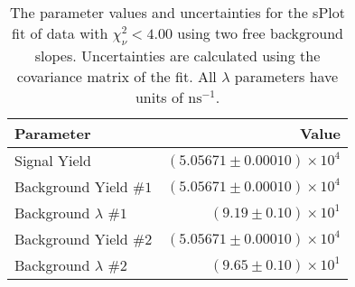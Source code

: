 
\begin{table}[ht]
    \begin{center}
        \begin{tabular}{lr}\toprule
            Parameter & Value \\\midrule
            Signal Yield & $(5.05671 \pm 0.00010) \times 10^{4}$ \\
            Background Yield $\#1$ & $(5.05671 \pm 0.00010) \times 10^{4}$ \\
            Background $\lambda$ $\#1$ & $(9.19 \pm 0.10) \times 10^{1}$ \\
            Background Yield $\#2$ & $(5.05671 \pm 0.00010) \times 10^{4}$ \\
            Background $\lambda$ $\#2$ & $(9.65 \pm 0.10) \times 10^{1}$ \\\bottomrule
        \end{tabular}
        \caption{The parameter values and uncertainties for the sPlot fit of data with $\chi^2_\nu < 4.00$ using two free background slopes. Uncertainties are calculated using the covariance matrix of the fit. All $\lambda$ parameters have units of $\si{\nano\second}^{-1}$.}\label{tab:splot-fit-results-chisqdof-4.00-free-2}
    \end{center}
\end{table}
